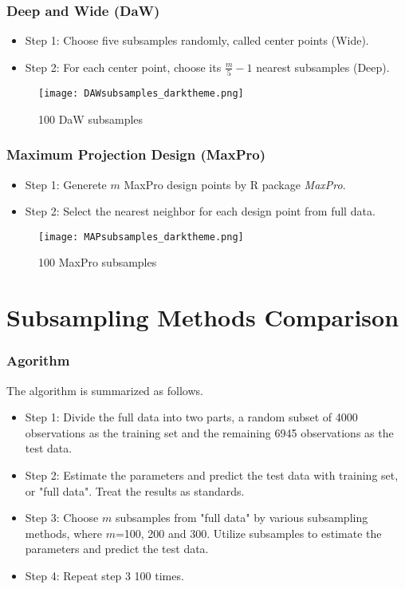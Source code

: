 \documentclass{beamer}
\begin{document}
\begin{frame}
\frametitle{Deep and Wide (DaW)}
\begin{itemize}
\item Step 1: Choose five subsamples randomly, called center points (Wide).
\item Step 2: For each center point, choose its $\frac{m}{5}-1$ nearest subsamples (Deep).
\end{itemize}
\begin{figure}
\begin{center}
\texttt{[image: DAWsubsamples\_darktheme.png]}\\
\caption{100 DaW subsamples}
\label{Figure 3}
\end{center}
\end{figure}
\end{frame}

\begin{frame}
\frametitle{Maximum Projection Design (MaxPro)}
\begin{itemize}
\item Step 1: Generete $m$ MaxPro design points by R package \emph{MaxPro}.
\item Step 2: Select the nearest neighbor for each design point from full data.
\end{itemize}
\begin{figure}
\begin{center}
\texttt{[image: MAPsubsamples\_darktheme.png]}\\
\caption{100 MaxPro subsamples}
\label{Figure 4}
\end{center}
\end{figure}
\end{frame}

\section{Subsampling Methods Comparison}
\begin{frame}
\frametitle{Agorithm}
The algorithm is summarized as follows.
\begin{itemize}
\item Step 1: Divide the full data into two parts, a random subset of 4000 observations as the training set and the remaining 6945 observations as the test data.
\item Step 2: Estimate the parameters and predict the test data with training set, or "full data". Treat the results as standards.
\item Step 3: Choose $m$ subsamples from "full data" by various subsampling methods, where $m$=100, 200 and 300. Utilize subsamples to estimate the parameters and predict the test data.
\item Step 4: Repeat step 3 100 times.
\end{itemize}
\end{frame}
\end{document}
